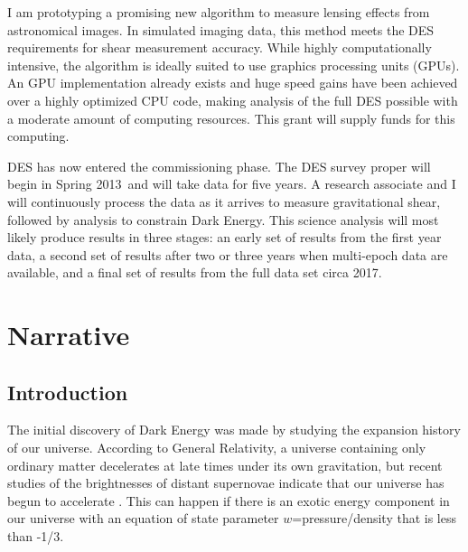 \documentclass[12pt]{article}
\newcommand{\surveyproper}{Spring 2013}
\begin{document}
I am prototyping a promising new algorithm to measure lensing effects from
astronomical images.  In simulated imaging data, this method meets the DES
requirements for shear measurement accuracy. While highly computationally
intensive, the algorithm is ideally suited to use graphics processing units
(GPUs). An GPU implementation already exists and huge speed gains have been
achieved over a highly optimized CPU code, making analysis of the full DES
possible with a moderate amount of computing resources.   This grant will
supply funds for this computing.

DES has now entered the commissioning phase.  The DES survey proper will begin
in \surveyproper\ and will take data for five years. A research associate and I
will continuously process the data as it arrives to measure gravitational
shear, followed by analysis to constrain Dark Energy.  This science analysis
will most likely produce results in three stages: an early set of results from
the first year data, a second set of results after two or three years when
multi-epoch data are available, and a final set of results from the full data
set circa 2017.


\newpage
{}
\section*{Narrative}
\setcounter{section}{1}
\subsection{Introduction}

The initial discovery of Dark Energy was made by studying the expansion history
of our universe.  According to General Relativity, a universe containing only
ordinary matter decelerates at late times under its own gravitation, but recent
studies of the brightnesses of distant supernovae indicate that our universe
has begun to accelerate \cite{Riess98,Perlmutter99}.  This can happen if there
is an exotic energy component in our universe with an equation of state
parameter $w$=pressure/density that is less than -1/3.
\end{document}
